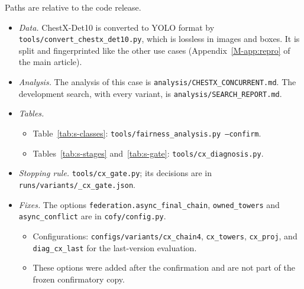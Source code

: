 \documentclass[pdflatex,sn-mathphys-num]{sn-jnl}
\begin{document}
Paths are relative to the code release.
\begin{itemize}
\item \emph{Data.} ChestX-Det10 is converted to YOLO format by \texttt{tools/convert\_chestx\_det10.py}, which is lossless in images and boxes. It is split and fingerprinted like the other use cases (Appendix~\ref{M-app:repro} of the main article).
\item \emph{Analysis.} The analysis of this case is \texttt{analysis/CHESTX\_CONCURRENT.md}. The development search, with every variant, is \texttt{analysis/SEARCH\_REPORT.md}.
\item \emph{Tables.}
  \begin{itemize}
  \item Table~\ref{tab:s-classes}: \texttt{tools/fairness\_analysis.py --confirm}.
  \item Tables~\ref{tab:s-stages} and~\ref{tab:s-gate}: \texttt{tools/cx\_diagnosis.py}.
  \end{itemize}
\item \emph{Stopping rule.} \texttt{tools/cx\_gate.py}; its decisions are in \texttt{runs/variants/\_cx\_gate.json}.
\item \emph{Fixes.} The options \texttt{federation.async\_final\_chain}, \texttt{owned\_towers} and \texttt{async\_conflict} are in \texttt{cofy/config.py}.
  \begin{itemize}
  \item Configurations: \texttt{configs/variants/cx\_chain4}, \texttt{cx\_towers}, \texttt{cx\_proj}, and \texttt{diag\_cx\_last} for the last-version evaluation.
  \item These options were added after the confirmation and are not part of the frozen confirmatory copy.
  \end{itemize}
\end{itemize}


\end{document}
